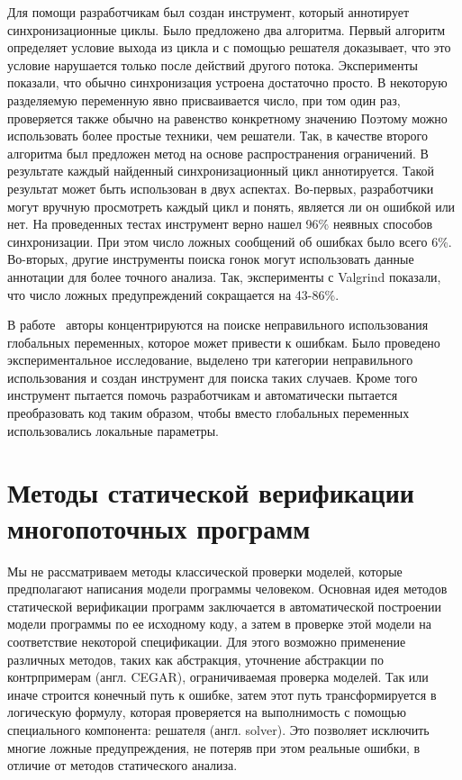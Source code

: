 Для помощи разработчикам был создан инструмент, который аннотирует синхронизационные циклы.
Было предложено два алгоритма.
Первый алгоритм определяет условие выхода из цикла и с помощью решателя доказывает, что это условие нарушается только после действий другого потока.
Эксперименты показали, что обычно синхронизация устроена достаточно просто.
В некоторую разделяемую переменную явно присваивается число, при том один раз, проверяется также обычно на равенство конкретному значению
Поэтому можно использовать более простые техники, чем решатели.
Так, в качестве второго алгоритма был предложен метод на основе распространения ограничений.
В результате каждый найденный синхронизационный цикл аннотируется. Такой результат может быть использован в двух аспектах.
Во-первых, разработчики могут вручную просмотреть каждый цикл и понять, является ли он ошибкой или нет.
На проведенных тестах инструмент верно нашел 96\% неявных способов синхронизации. При этом число ложных сообщений об ошибках было всего 6\%.
Во-вторых, другие инструменты поиска гонок могут использовать данные аннотации для более точного анализа.
Так, эксперименты с Valgrind показали, что число ложных предупреждений сокращается на 43-86\%. 

В работе~\cite{Smith:2011:LGS} авторы концентрируются на поиске неправильного использования глобальных переменных, которое может привести к ошибкам.
Было проведено экспериментальное исследование, выделено три категории неправильного использования и создан инструмент для поиска таких случаев.
Кроме того инструмент пытается помочь разработчикам и автоматически пытается преобразовать код таким образом, чтобы вместо глобальных переменных использовались локальные параметры.


\section{Методы статической верификации многопоточных программ}
\label{rw:bmc}

Мы не рассматриваем методы классической проверки моделей, которые предполагают написания модели программы человеком. 
Основная идея методов статической верификации программ заключается в автоматической построении модели программы по ее исходному коду, а затем в проверке этой модели на соответствие некоторой спецификации.
Для этого возможно применение различных методов, таких как абстракция, уточнение абстракции по контрпримерам (англ. CEGAR), ограничиваемая проверка моделей.
Так или иначе строится конечный путь к ошибке, затем этот путь трансформируется в логическую формулу, которая проверяется на выполнимость с помощью специального компонента: решателя (англ. solver).
Это позволяет исключить многие ложные предупреждения, не потеряв при этом реальные ошибки, в отличие от методов статического анализа.

